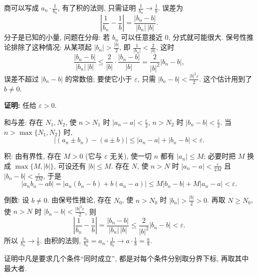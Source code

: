 \documentclass[UTF8,openany]{ctexbook}
\theoremstyle{chinesetextbook}
\newenvironment{cnproof}{\par\indent\textbf{证明:} \ignorespaces}{\par}
\begin{document}
商可以写成 $\displaystyle a_n\cdot\frac1{b_n}$, 有了积的法则, 只需证明 $\displaystyle\frac1{b_n}\to\frac1b$. 误差为
\[
\left|\frac1{b_n}-\frac1b\right|=\frac{|b_n-b|}{|b_n|\,|b|}.
\]
分子是已知的小量, 问题在分母: 若 $b_n$ 可以任意接近 $0$, 分式就可能很大. 保号性推论排除了这种情况: 从某项起 $\displaystyle|b_n|>\frac{|b|}2$, 即 $\displaystyle\frac1{|b_n|}<\frac2{|b|}$, 这时
\[
\frac{|b_n-b|}{|b_n|\,|b|}\le\frac2{|b|}\cdot\frac{|b_n-b|}{|b|}=\frac2{|b|^2}|b_n-b|,
\]
误差不超过 $|b_n-b|$ 的常数倍; 要使它小于 $\varepsilon$, 只需 $\displaystyle|b_n-b|<\frac{|b|^2\varepsilon}2$. 这个估计用到了 $b\ne0$.
\begin{cnproof}
任给 $\varepsilon>0$.

和与差: 存在 $N_1,N_2$, 使 $n>N_1$ 时 $\displaystyle|a_n-a|<\frac\varepsilon2$, $n>N_2$ 时 $\displaystyle|b_n-b|<\frac\varepsilon2$. 当 $n>\max\{N_1,N_2\}$ 时,
\[
|(a_n\pm b_n)-(a\pm b)|\le|a_n-a|+|b_n-b|<\varepsilon.
\]

积: 由有界性, 存在 $M>0$ (它与 $\varepsilon$ 无关), 使一切 $n$ 都有 $|a_n|\le M$; 必要时把 $M$ 换成 $\max\{M,|b|\}$, 可设还有 $|b|\le M$. 存在 $N$, 使 $n>N$ 时 $\displaystyle|a_n-a|<\frac\varepsilon{2M}$ 且 $\displaystyle|b_n-b|<\frac\varepsilon{2M}$, 于是
\[
|a_nb_n-ab|=|a_n(b_n-b)+b(a_n-a)|\le M|b_n-b|+M|a_n-a|<\varepsilon.
\]

倒数: 设 $b\ne0$. 由保号性推论, 存在 $N_0$, 使 $n>N_0$ 时 $\displaystyle|b_n|>\frac{|b|}2>0$. 再取 $N\ge N_0$, 使 $n>N$ 时 $\displaystyle|b_n-b|<\frac{|b|^2\varepsilon}2$, 则
\[
\left|\frac1{b_n}-\frac1b\right|=\frac{|b_n-b|}{|b_n|\,|b|}\le\frac2{|b|^2}|b_n-b|<\varepsilon.
\]
所以 $\displaystyle\frac1{b_n}\to\frac1b$. 由积的法则, $\displaystyle\frac{a_n}{b_n}=a_n\cdot\frac1{b_n}\to a\cdot\frac1b=\frac ab$.
\end{cnproof}
证明中凡是要求几个条件“同时成立”, 都是对每个条件分别取分界下标, 再取其中最大者.
\end{document}
